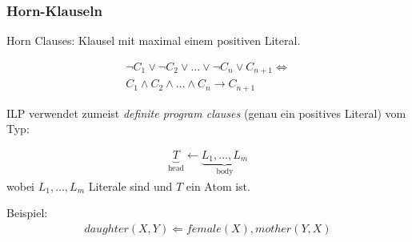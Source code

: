 \begin{frame}
	\frametitle{Horn-Klauseln}
	Horn Clauses: Klausel mit maximal einem positiven Literal.

	\begin{align*}
		\neg C_1 \lor \neg C_2 \lor \ldots \lor \neg C_n  \lor C_{n+1} \Leftrightarrow\\
		C_1 \land C_2 \land \ldots \land C_n  \rightarrow C_{n+1}
	\end{align*}

	ILP verwendet zumeist \textit{definite program clauses } (genau ein positives Literal) vom Typ:

	\begin{align*}
		\underbrace{T}_{\text{head}} \leftarrow \underbrace{L_1, \ldots, L_m}_{\text{body}}
	\end{align*}
	wobei $L_1, \ldots, L_m$ Literale sind und $T$ ein Atom ist.

	Beispiel:
	\begin{align*}
		daughter(X,Y) \Leftarrow female(X), mother(Y, X)
	\end{align*}
\end{frame}

